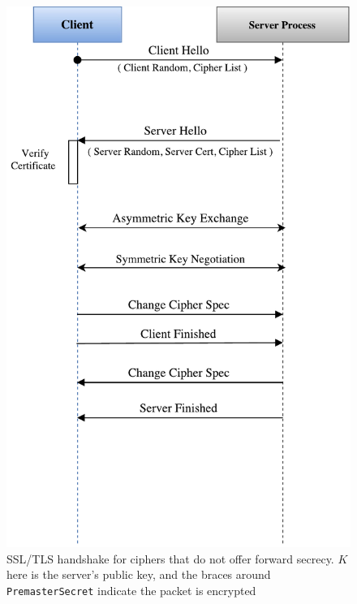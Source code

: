 \documentclass[../main.tex]{subfiles}
\begin{document}
\begin{figure}[H]
  \centering
  \includegraphics[draft,scale=0.4]{images/rsa-handshake-pristine.pdf}
  \caption[SSL/TLS ``RSA'' handshake]{SSL/TLS handshake for ciphers
    that do not offer forward secrecy. $K$ here is the server's public
    key, and the braces around \texttt{PremasterSecret} indicate the
    packet is encrypted}
  \label{fig:pristrsashake}
\end{figure}
\end{document}
